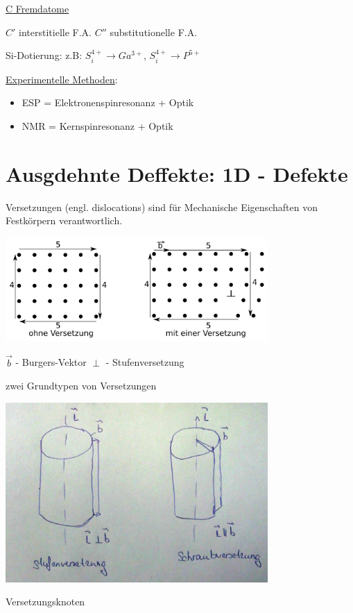 \underline{C Fremdatome}

\(C'\) interstitielle F.A.
\(C''\) substitutionelle F.A.

Si-Dotierung: z.B: \(S_i^{4+}\rightarrow Ga^{3+}\), \(S_i^{4+}\rightarrow P^{5+}\)

\underline{Experimentelle Methoden}:

\begin{itemize}
\item ESP = Elektronenspinresonanz + Optik
\item NMR = Kernspinresonanz + Optik
\end{itemize}


\section{Ausgdehnte Deffekte: 1D - Defekte}

Versetzungen (engl. dislocations) sind für Mechanische Eigenschaften
von Festkörpern verantwortlich. 


\includegraphics[width=0.75\textwidth]{kap04_02.png}

\(\vec b\) - Burgers-Vektor
\(\perp\) - Stufenversetzung

zwei Grundtypen von Versetzungen

\includegraphics[width=0.75\textwidth]{kap04_03.png}

Versetzungsknoten


